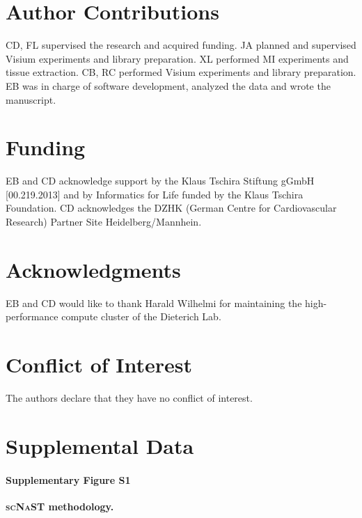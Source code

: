 \documentclass[utf8]{FrontiersinHarvard} %
\newcommand{\scnast}{\textsc{scNaST}\xspace}
\begin{document}
\section*{Author Contributions}
CD, FL supervised the research and acquired funding.
JA planned and supervised Visium experiments and library preparation.
XL performed MI experiments and tissue extraction.
CB, RC performed Visium experiments and library preparation.
EB was in charge of software development, analyzed the data and wrote the manuscript.

\section*{Funding}
EB and CD acknowledge support by the Klaus Tschira Stiftung gGmbH [00.219.2013] and by Informatics for Life funded by the Klaus Tschira Foundation. 
CD acknowledges the DZHK (German Centre for Cardiovascular Research) Partner Site Heidelberg/Mannhein.

\section*{Acknowledgments}
EB and CD would like to thank Harald Wilhelmi for maintaining the high-performance compute cluster of the Dieterich Lab.

\section*{Conflict of Interest}
The authors declare that they have no conflict of interest.

\section*{Supplemental Data}

\paragraph*{Supplementary Figure S1}
\label{fig:S1}
{\bf \scnast methodology.}
\end{document}

